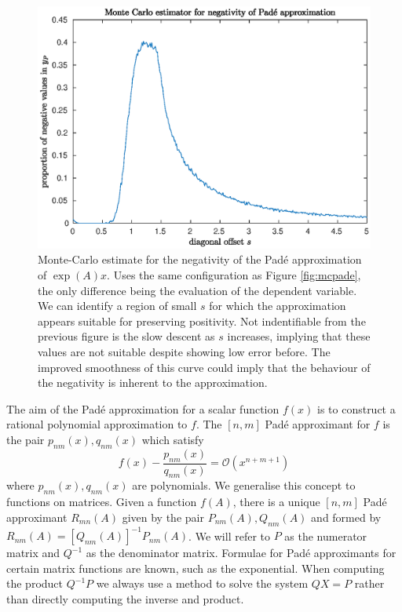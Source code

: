 \begin{figure}
    \centering
    \includegraphics[width=\linewidth]{Matlab/padenegativemc.eps}
    \caption{
        Monte-Carlo estimate for the negativity of the Pad\'e approximation of $\exp(A)x$.
        Uses the same configuration as Figure \ref{fig:mcpade}, the only difference being the evaluation of the dependent variable.
        We can identify a region of small $s$ for which the approximation appears suitable for preserving positivity.
        Not indentifiable from the previous figure is the slow descent as $s$ increases, implying that these values are not suitable despite showing low error before.
        The improved smoothness of this curve could imply that the behaviour of the negativity is inherent to the approximation.
    }
    \label{fig:mcpadeneg}
\end{figure}

The aim of the Pad\'e approximation for a scalar function $f(x)$ is to construct a rational polynomial approximation to $f$.
The $[n,m]$ Pad\'e approximant for $f$ is the pair $p_{nm}(x), q_{nm}(x)$ which satisfy
\begin{equation*}
    f(x) - \frac{p_{nm}(x)}{q_{nm}(x)} = \mathcal{O}(x^{n+m+1})
\end{equation*} 
where $p_{nm}(x), q_{nm}(x)$ are polynomials.
We generalise this concept to functions on matrices. Given a function $f(A)$, there is a unique $[n,m]$ Pad\'e approximant $R_{mn}(A)$ given by the pair $P_{nm}(A), Q_{nm}(A)$ and formed by $R_{nm}(A) = \left[Q_{nm}(A)\right]^{-1}P_{nm}(A)$.
We will refer to $P$ as the numerator matrix and $Q^{-1}$ as the denominator matrix.
Formulae for Pad\'e approximants for certain matrix functions are known, such as the exponential. 
When computing the product $Q^{-1}P$ we always use a method to solve the system $QX=P$ rather than directly computing the inverse and product.


